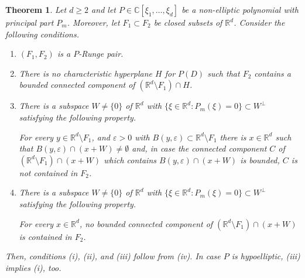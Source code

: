\documentclass[10pt,leqno]{amsart}
\newtheorem{theorem}[prop]{Theorem}
\theoremstyle{definition}
\newcommand{\R}{\mathbb R}
\newcommand{\C}{\mathbb C}
\let\epsilon\varepsilon
\begin{document}
\begin{theorem}\label{thm-non-elliptic}
	Let $d\geq 2$ and let $P\in\C[\xi_1,\ldots,\xi_d]$ be a non-elliptic polynomial with principal part $P_m$. Moreover, let $F_1\subset F_2$ be closed subsets of $\R^d$. Consider the following conditions.
	\begin{enumerate}
		\item[(i)] $(F_1, F_2)$ is a $P$-Runge pair.
		\item[(ii)] There is no characteristic hyperplane $H$ for $P(D)$ such that $F_2$ contains a bounded connected component of $(\R^d\setminus F_1)\cap H$.
		\item[(iii)] There is a subspace $W\neq \{0\}$ of $\R^d$ with $\{\xi\in\R^d\colon P_m(\xi)=0\}\subset W^\perp$ satisfying the following property.
		
		For every $y\in\R^d\setminus F_1$, and $\epsilon>0$ with $B(y,\epsilon)\subset\R^d\setminus F_1$ there is $x\in\R^d$ such that $B(y,\epsilon)\cap (x+W)\neq\emptyset$ and, in case the connected component $C$ of $(\R^d\setminus F_1)\cap (x+W)$ which contains $B(y,\epsilon)\cap (x+W)$ is bounded, $C$ is not contained in $F_2$. 
		\item[(iv)] There is a subspace $W\neq \{0\}$ of $\R^d$ with $\{\xi\in\R^d\colon P_m(\xi)=0\}\subset W^\perp$ satisfying the following property.
		
		For every $x\in\R^d$, no bounded connected component of $(\R^d\setminus F_1)\cap (x+W)$ is contained in $F_2$.
	\end{enumerate}
	Then, conditions (i), (ii), and (iii) follow from (iv). In case $P$ is hypoelliptic, (iii) implies (i), too.
\end{theorem}
\end{document}
